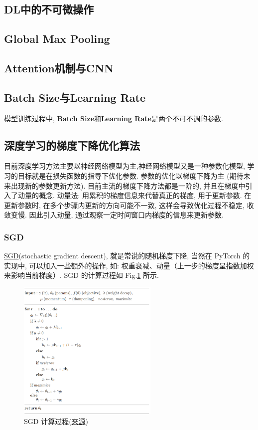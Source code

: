 \subsection{DL中的不可微操作}

\subsection{Global Max Pooling}

\subsection{Attention机制与CNN}

\subsection{Batch Size与Learning Rate}
模型训练过程中, \textbf{Batch Size}和\textbf{Learning Rate}是两个不可不调的参数. 


\subsection{深度学习的梯度下降优化算法}

目前深度学习方法主要以神经网络模型为主,神经网络模型又是一种参数化模型, 学习的目标就是在损失函数的指导下优化参数. 参数的优化以梯度下降为主 (期待未来出现新的参数更新方法). 目前主流的梯度下降方法都是一阶的, 并且在梯度中引入了动量的概念. 动量法: 用累积的梯度信息来代替真正的梯度, 用于更新参数. 在更新参数时, 在多个步骤内更新的方向可能不一致, 这样会导致优化过程不稳定, 收敛变慢. 因此引入动量, 通过观察一定时间窗口内梯度的信息来更新参数. 

\subsubsection{SGD}
\href{https://pytorch.org/docs/stable/generated/torch.optim.SGD.html#torch.optim.SGD}{SGD}(stochastic gradient descent), 就是常说的随机梯度下降, 当然在 PyTorch 的实现中, 可以加入一些额外的操作, 如: 权重衰减、动量（上一步的梯度呈指数加权来影响当前梯度）. SGD 的计算过程如 Fig.\ref{fig:sgd} 所示. 

\begin{figure}[h]
	\centering
	\includegraphics[width=0.6\textwidth]{pics/sgd.png}
	\caption{SGD 计算过程(\href{https://pytorch.org/docs/stable/generated/torch.optim.SGD.html#torch.optim.SGD}{来源})}
	\label{fig:sgd}
\end{figure}

